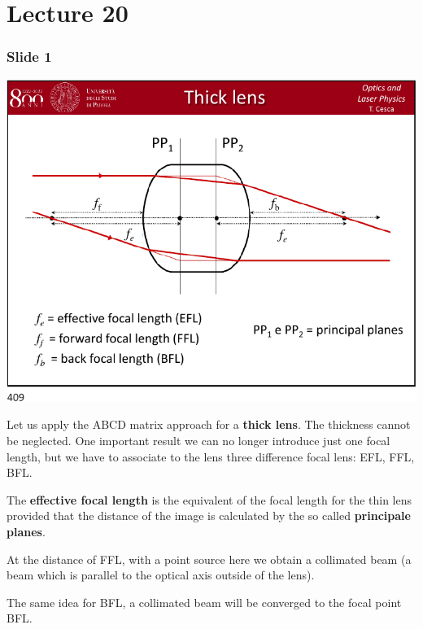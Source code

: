 \documentclass[../main/main.tex]{subfiles}
\begin{document}
\pagestyle{plain}

\section{Lecture 20}


\subsubsection*{Slide 1}

\begin{minipage}[]{0.5\linewidth}
\centering
\includegraphics[page=1,width=1\textwidth]{../lessons/pdf_file/20_lecture.pdf}
\end{minipage}
\hspace{0.3cm}\vspace{0.3cm}
\begin{minipage}[c]{0.47\linewidth}

Let us apply the ABCD matrix approach for a \textbf{thick lens}. The thickness cannot be neglected. One important result we can no longer introduce just one focal length, but we have to associate to the lens three difference focal lens: EFL, FFL, BFL.

The \textbf{effective focal length} is the equivalent of the focal length for the thin lens provided that the distance of the image is calculated by the so called \textbf{principale planes}.

At the distance of FFL, with a point source here we obtain a collimated beam (a beam which is parallel to the optical axis outside of the lens).

The same idea for BFL, a collimated beam will be converged to the focal point BFL.

\end{minipage}
\end{document}
